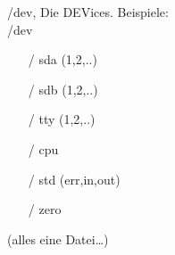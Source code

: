 \begin{frame}{/dev, Die DEVices.}
Beispiele:\\
/dev
\begin{itemize}
 \item [/] sda (1,2,..)
 \item [/] sdb (1,2,..)
 \item [/] tty (1,2,..)
 \item [/] cpu
 \item [/] std (err,in,out)
 \item [/] zero
\end{itemize}
(alles eine Datei…)
\end{frame}

